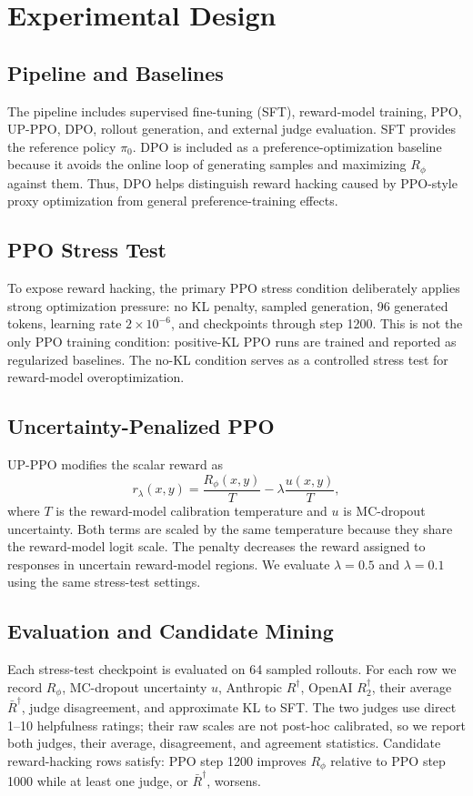 \documentclass[twocolumn,10pt]{article}
\newcommand{\Rphi}{R_{\phi}}
\newcommand{\Rdag}{R^{\dagger}}
\newcommand{\Rtwo}{R^{\dagger}_2}
\begin{document}
\section{Experimental Design}
\subsection{Pipeline and Baselines}
The pipeline includes supervised fine-tuning (SFT), reward-model training, PPO, UP-PPO, DPO, rollout generation, and external judge evaluation. SFT provides the reference policy $\pi_0$. DPO is included as a preference-optimization baseline because it avoids the online loop of generating samples and maximizing $\Rphi$ against them. Thus, DPO helps distinguish reward hacking caused by PPO-style proxy optimization from general preference-training effects.

\subsection{PPO Stress Test}
To expose reward hacking, the primary PPO stress condition deliberately applies strong optimization pressure: no KL penalty, sampled generation, 96 generated tokens, learning rate $2\times 10^{-6}$, and checkpoints through step 1200. This is not the only PPO training condition: positive-KL PPO runs are trained and reported as regularized baselines. The no-KL condition serves as a controlled stress test for reward-model overoptimization.

\subsection{Uncertainty-Penalized PPO}
UP-PPO modifies the scalar reward as
\begin{equation}
    r_\lambda(x,y)=\frac{\Rphi(x,y)}{T}-\lambda\frac{u(x,y)}{T},
\end{equation}
where $T$ is the reward-model calibration temperature and $u$ is MC-dropout uncertainty. Both terms are scaled by the same temperature because they share the reward-model logit scale. The penalty decreases the reward assigned to responses in uncertain reward-model regions. We evaluate $\lambda=0.5$ and $\lambda=0.1$ using the same stress-test settings.


\subsection{Evaluation and Candidate Mining}
Each stress-test checkpoint is evaluated on 64 sampled rollouts. For each row we record $\Rphi$, MC-dropout uncertainty $u$, Anthropic $\Rdag$, OpenAI $\Rtwo$, their average $\bar R^\dagger$, judge disagreement, and approximate KL to SFT. The two judges use direct 1--10 helpfulness ratings; their raw scales are not post-hoc calibrated, so we report both judges, their average, disagreement, and agreement statistics. Candidate reward-hacking rows satisfy: PPO step 1200 improves $\Rphi$ relative to PPO step 1000 while at least one judge, or $\bar R^\dagger$, worsens.
\end{document}
